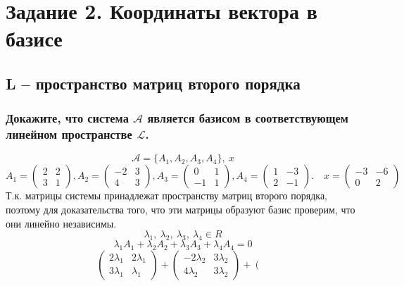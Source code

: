 \documentclass{article}
\begin{document}
\section*{Задание 2. Координаты вектора в базисе}
\subsection*{L – пространство матриц второго порядка}
\subsubsection*{Докажите, что система $\mathcal{A}$ является базисом в соответствующем линейном пространстве $\mathcal{L}$.}
\begin{center}
  $$ \mathcal{A} = \{A_1, A_2, A_3, A_4\},\ x$$
  $$
    A_1=\left(\begin{array}{ll}
        2 & 2 \\
        3 & 1
      \end{array}\right), A_2=\left(\begin{array}{cc}
        -2 & 3 \\
        4  & 3
      \end{array}\right), A_3=\left(\begin{array}{cc}
        0  & 1 \\
        -1 & 1
      \end{array}\right), A_4=\left(\begin{array}{ll}
        1 & -3 \\
        2 & -1
      \end{array}\right) . \quad x=\left(\begin{array}{cc}
        -3 & -6 \\
        0  & 2
      \end{array}\right)
  $$
  Т.к. матрицы системы принадлежат пространству матриц второго порядка, поэтому для доказательства того, что эти матрицы образуют базис проверим, что они линейно независимы.
  $$
    \lambda_1,\ \lambda_2,\ \lambda_3,\ \lambda_4 \in R
  $$$$
    \lambda_1 A_1+\lambda_2 A_2+\lambda_3 A_3+\lambda_4 A_4=0
  $$$$
    \left(\begin{array}{cc}
        2 \lambda_1 & 2 \lambda_1 \\
        3 \lambda_1 & \lambda_1
      \end{array}\right)+\left(\begin{array}{cc}
        -2 \lambda_2 & 3 \lambda_2 \\
        4 \lambda_2  & 3 \lambda_2
      \end{array}\right)+\left(\begin{array}{cc}

\end{array}$$
\end{center}
\end{document}
